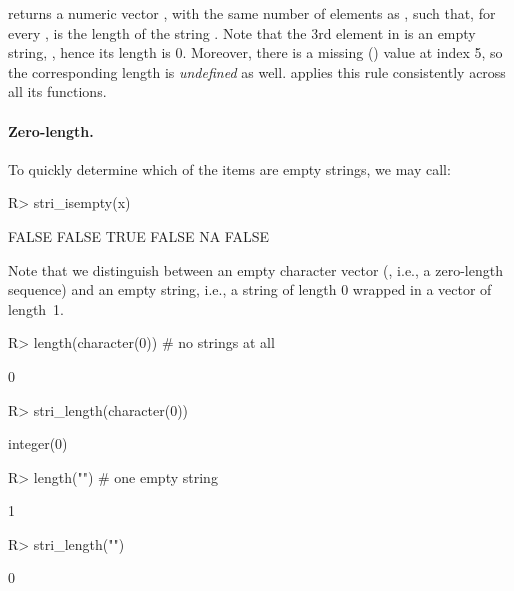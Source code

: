 \documentclass[nojss]{jss}
\newcommand{\strq}[1]{\code{{"{}#1"{}}}}
\begin{document}
\noindent
{} returns a numeric vector ,
with the same number of elements as , such that, for every ,
 is the length of the string .
Note that the 3rd element in  is an empty string, \strq{},
hence its length is  0.
Moreover, there is a missing () value
at index 5, so the corresponding length is \textit{undefined} as well.
 applies this rule consistently across all its functions.



\paragraph{Zero-length.}
To quickly determine which of the items are empty strings, we may call:

\begin{Schunk}
\begin{Sinput}
R> stri_isempty(x)
\end{Sinput}
\begin{Soutput}
[1] FALSE FALSE  TRUE FALSE    NA FALSE
\end{Soutput}
\end{Schunk}

\noindent
Note that we distinguish between an empty character vector
(, i.e., a zero-length sequence)
and an empty string, i.e., a string of length 0 wrapped in a vector of length~1.

\begin{Schunk}
\begin{Sinput}
R> length(character(0))      # no strings at all
\end{Sinput}
\begin{Soutput}
[1] 0
\end{Soutput}
\begin{Sinput}
R> stri_length(character(0))
\end{Sinput}
\begin{Soutput}
integer(0)
\end{Soutput}
\begin{Sinput}
R> length("")                # one empty string
\end{Sinput}
\begin{Soutput}
[1] 1
\end{Soutput}
\begin{Sinput}
R> stri_length("")
\end{Sinput}
\begin{Soutput}
[1] 0
\end{Soutput}
\end{Schunk}
\end{document}

